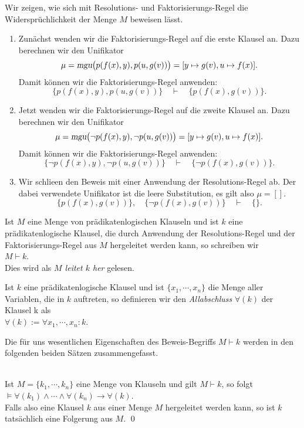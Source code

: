 \noindent
Wir zeigen, wie sich mit Resolutions- und Faktorisierungs-Regel die Widerspr\"{u}chlichkeit
der Menge $M$ beweisen l\"{a}sst.
\begin{enumerate}
\item Zun\"{a}chst wenden wir die Faktorisierungs-Regel auf die erste Klausel an. 
      Dazu berechnen wir den Unifikator 
      \[ \mu = \textsl{mgu}\bigl(p(f(x),y), p(u,g(v))\bigr) = [y \mapsto g(v), u \mapsto f(x)]. \]
      Damit k\"{o}nnen wir die Faktorisierungs-Regel anwenden: 
      \[ \bigl\{p(f(x),y), p(u,g(v))\bigr\} \quad \vdash \quad \bigl\{p(f(x),g(v))\bigr\}. \]
\item Jetzt wenden wir die Faktorisierungs-Regel auf die zweite Klausel an.
      Dazu berechnen wir  den Unifikator 
      \[ \mu = \textsl{mgu}\bigl(\neg p(f(x),y), \neg p(u,g(v))\bigr) = [y \mapsto g(v), u \mapsto f(x)]. 
      \]
      Damit k\"{o}nnen wir die Faktorisierungs-Regel anwenden: 
      \[ \bigl\{ \neg p(f(x),y), \neg p(u,g(v))\bigr\} \quad \vdash \quad \bigl\{\neg p(f(x),g(v))\bigr\}.
      \]
\item Wir schlie\3en den Beweis mit einer Anwendung der Resolutions-Regel ab.
      Der dabei verwendete Unifikator ist die leere Substitution, es gilt also $\mu = []$.      
      \[ \bigl\{p(f(x),g(v))\bigr\}, \quad \bigl\{\neg p(f(x),g(v))\bigr\} \quad \vdash \quad \{\}. \]
\end{enumerate}
Ist $M$ eine Menge von pr\"{a}dikatenlogischen Klauseln und ist $k$ eine pr\"{a}dikatenlogische
Klausel, die durch Anwendung der Resolutions-Regel und der Faktorisierungs-Regel aus $M$
hergeleitet werden kann, so schreiben wir \\[0.2cm]
\hspace*{1.3cm} $M \vdash k$.
\\[0.2cm]
Dies wird als \emph{$M$ leitet $k$ her} gelesen.

\begin{Definition}[Allabschluss]
  Ist $k$ eine pr\"{a}dikatenlogische Klausel und ist $\{x_1,\cdots,x_n\}$
  die Menge aller Variablen, die in $k$ auftreten, so definieren wir
  den \emph{Allabschluss}  $\forall(k)$  der Klausel k als \\[0.2cm]
  \hspace*{1.3cm} $\forall(k) := \forall x_1, \cdots,x_n \colon k$. \eox
\end{Definition}

\noindent
Die f\"{u}r uns wesentlichen Eigenschaften des Beweis-Begriffs $M \vdash k$ werden in den folgenden
beiden S\"{a}tzen zusammengefasst.
\begin{Satz} \hspace*{\fill} \\
    Ist $M = \{k_1,\cdots,k_n\}$ eine Menge von Klauseln und gilt $M \vdash k$, so folgt \\[0.2cm]
    \hspace*{1.3cm} $\models \forall(k_1) \wedge \cdots \wedge \forall(k_n) \rightarrow \forall(k)$. \\[0.2cm]
    Falls also eine Klausel $k$ aus einer Menge $M$ hergeleitet werden kann,
    so ist $k$ tats\"{a}chlich eine Folgerung aus $M$. \qed
\end{Satz}

